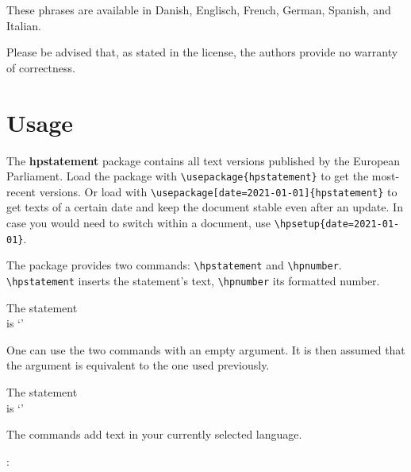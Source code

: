\documentclass[a4paper,notitlepage,parskip=half]{scrreprt}
\begin{document}
These phrases are
available in Danish, Englisch, French, German, Spanish, and
Italian.

\bigskip

Please be advised that, as stated in the license, the authors provide no
warranty of correctness.


\section{Usage}

The \textbf{hpstatement} package contains all text versions published by the European Parliament.
Load the package with \verb|\usepackage{hpstatement}| to get the most-recent versions.
Or load with \verb|\usepackage[date=2021-01-01]{hpstatement}| to get texts of a certain date and keep the document stable even after an update.
In case you would need to switch within a document, use \verb|\hpsetup{date=2021-01-01}|.

The package provides two commands: \verb|\hpstatement| and \verb|\hpnumber|.
\verb|\hpstatement| inserts the statement's text,
\verb|\hpnumber| its formatted number.\bigskip

\begin{addmargin}[1em]{0em}
\begin{SideBySideExample}[xrightmargin=7cm]
  The statement \\
  is `'
\end{SideBySideExample}
\end{addmargin}
\bigskip

\noindent One can use the two commands with an empty argument. It is then assumed that the argument is equivalent to the one used previously. \bigskip

\begin{addmargin}[1em]{0em}
\begin{SideBySideExample}[xrightmargin=7cm]
  The statement \\
  is `\hpstatement{}'
\end{SideBySideExample}
\end{addmargin}
\bigskip

\noindent The commands add text in your currently selected language.
\bigskip

\begin{addmargin}[1em]{0em}
\begin{SideBySideExample}[xrightmargin=7cm]
  :
  \hpstatement{}
\end{SideBySideExample}
\end{addmargin}
\bigskip
\end{document}
